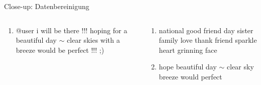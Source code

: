 \documentclass[aspectratio=169]{beamer} %
\begin{document}
\begin{frame}{Close-up: Datenbereinigung}
\begin{columns}[T]
\begin{column}{0.5\textwidth}
\begin{enumerate}[label=\arabic*.]
                \item \textcolor{myblue}{@user} 
                \textcolor{mygreen}{i will be there} 
                \textcolor{myred}{!!!} 
                \textcolor{mybrown}{hoping} 
                \textcolor{mygreen}{for a} beautiful day \(  \sim  \)  clear \textcolor{mybrown}{skies} 
                \textcolor{mygreen}{with a} breeze would 
                \textcolor{mygreen}{be} perfect 
                \textcolor{myred}{!!! ;)} 
            \end{enumerate}
        \end{column}
        \begin{column}{0.5\textwidth}
            \begin{enumerate}[label=\arabic*.] 
                \item 
                \textcolor{myorange}{national} 
                \textcolor{myorange}{go}\textcolor{mybrown}{od} 
                \textcolor{myorange}{fri}\textcolor{mybrown}{end} 
                \textcolor{myorange}{day}
                \textcolor{mybrown}{sister} family love thank friend 
                \textcolor{mypurple}{sparkle heart grinning face}
                \item \textcolor{mybrown}{hope} beautiful day \(  \sim  \) clear 
                \textcolor{mybrown}{sky} breeze would perfect
            \end{enumerate}
        \end{column}
    \end{columns}
\end{frame}
\end{document}
